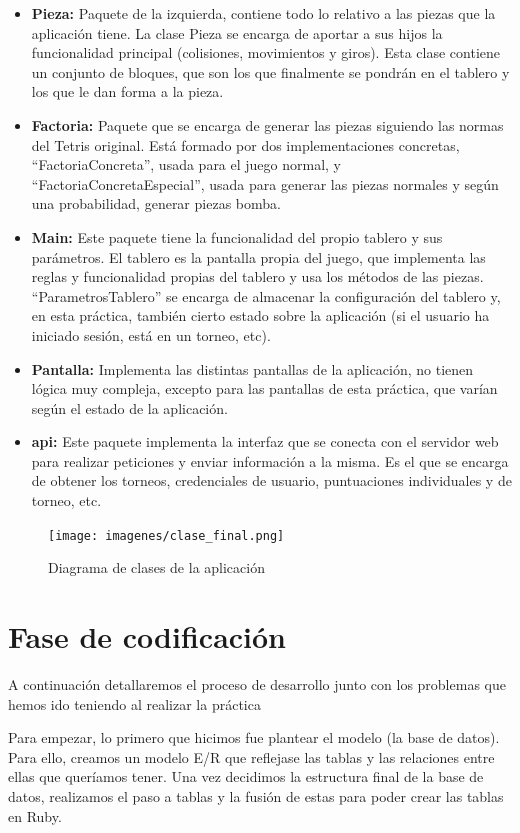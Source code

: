 \documentclass{article}
\begin{document}
\begin{itemize}
  \item \textbf{Pieza: }Paquete de la izquierda, contiene todo lo relativo a las piezas que la aplicación tiene. La clase Pieza se encarga de aportar a sus hijos la funcionalidad principal (colisiones, movimientos y giros). Esta clase contiene un conjunto de bloques, que son los que finalmente se pondrán en el tablero y los que le dan forma a la pieza.
  \item \textbf{Factoria: }Paquete que se encarga de generar las piezas siguiendo las normas del Tetris original. Está formado por dos implementaciones concretas, ``FactoriaConcreta'', usada para el juego normal, y ``FactoriaConcretaEspecial'', usada para generar las piezas normales y según una probabilidad, generar piezas bomba.
  \item \textbf{Main: }Este paquete tiene la funcionalidad del propio tablero y sus parámetros. El tablero es la pantalla propia del juego, que implementa las reglas y funcionalidad propias del tablero y usa los métodos de las piezas. ``ParametrosTablero'' se encarga de almacenar la configuración del tablero y, en esta práctica, también cierto estado sobre la aplicación (si el usuario ha iniciado sesión, está en un torneo, etc).
  \item \textbf{Pantalla: }Implementa las distintas pantallas de la aplicación, no tienen lógica muy compleja, excepto para las pantallas de esta práctica, que varían según el estado de la aplicación.
  \item \textbf{api: }Este paquete implementa la interfaz que se conecta con el servidor web para realizar peticiones y enviar información a la misma. Es el que se encarga de obtener los torneos, credenciales de usuario, puntuaciones individuales y de torneo, etc.
\end{itemize}


\begin{figure}[H]
  \texttt{[image: imagenes/clase\_final.png]}
  \caption{Diagrama de clases de la aplicación} 
\end{figure}

\section{Fase de codificación}
A continuación detallaremos el proceso de desarrollo junto con los problemas que hemos ido teniendo al realizar la práctica

Para empezar, lo primero que hicimos fue plantear el modelo (la base de datos). Para ello, creamos un modelo E/R que reflejase las tablas y las relaciones entre ellas
que queríamos tener. Una vez decidimos la estructura final de la base de datos, realizamos el paso a tablas y la fusión de estas para poder crear las tablas en Ruby.
\end{document}
